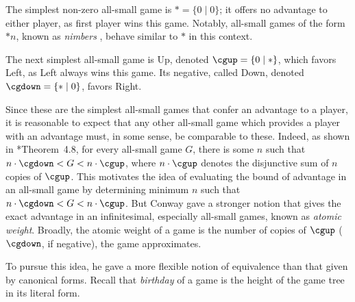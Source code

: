 \documentclass[oneside,reqno]{amsart}
\newcommand{\ur}[1]{\textcolor{blue}{#1}}
\begin{document}


    The simplest non-zero all-small game is $*=\{0\mid0\}$; it offers no advantage to either player, as first player wins this game. Notably, all-small games of the form $*n$, known as \emph{nimbers}%
    , behave similar to $*$ in this context. %
    
    The next simplest all-small game is Up, denoted $\cgup = \{0 \mid *\}$, which favors Left, as Left always wins this game. Its negative, called Down, denoted $\cgdown = \{* \mid 0\}$, favors Right.

    Since these are the simplest all-small games that confer an advantage to a player, it is reasonable to expect that any other all-small game which provides a player with an advantage must, in some sense, be comparable to these. Indeed, as shown in \cite{S2013}*{Theorem~4.8}, for every all-small game $G$, there is some $n$ such that $n\cdot\cgdown<G<n\cdot\cgup$, where $n\cdot\cgup$ denotes the disjunctive sum of $n$ copies of $\cgup$. This motivates the idea of evaluating the bound of advantage in an all-small game by %
    determining minimum $n$ such that $n\cdot\cgdown<G<n\cdot\cgup$. But Conway gave a stronger notion that gives the exact advantage in an infinitesimal, especially all-small games, known as \emph{atomic weight}. Broadly, the atomic weight of a game is the number of copies of $\cgup$ ($\cgdown$, if negative), the game approximates.

    To pursue this idea, he gave a more flexible notion of equivalence than that given by canonical forms. %
    Recall that {\em birthday} of a game is the height of the game tree in its literal form. 
\end{document}
